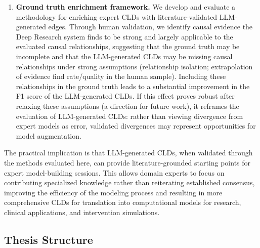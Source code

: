 \begin{enumerate}
    \item \textbf{Ground truth enrichment framework.} We develop and evaluate a methodology for enriching expert CLDs with literature-validated LLM-generated edges. Through human validation, we identify causal evidence the Deep Research system finds to be strong and largely applicable to the evaluated causal relationships, suggesting that the ground truth may be incomplete and that the LLM-generated CLDs may be missing causal relationships under strong assumptions (relationship isolation; extrapolation of evidence find rate/quality in the human sample). Including these relationships in the ground truth leads to a substantial improvement in the F1 score of the LLM-generated CLDs. If this effect proves robust after relaxing these assumptions (a direction for future work), it reframes the evaluation of LLM-generated CLDs: rather than viewing divergence from expert models as error, validated divergences may represent opportunities for model augmentation.
\end{enumerate}

The practical implication is that LLM-generated CLDs, when validated through the methods evaluated here, can provide literature-grounded starting points for expert model-building sessions. This allows domain experts to focus on contributing specialized knowledge rather than reiterating established consensus, improving the efficiency of the modeling process and resulting in more comprehensive CLDs for translation into computational models for research, clinical applications, and intervention simulations.

\subsection*{Thesis Structure}

